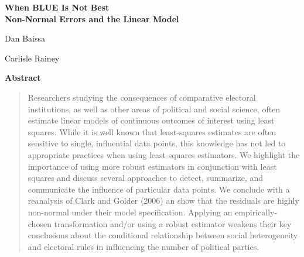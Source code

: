 \documentclass[12pt]{article}
\begin{document}
\begin{center}
{\LARGE \textbf{When BLUE Is Not Best}}\\\vspace{2mm}
{ \textbf{Non-Normal Errors and the Linear Model}}\\\vspace{2mm}


\vspace{10mm}

Dan Baissa

\vspace{3mm}

Carlisle Rainey
\end{center}

\vspace{10mm}

{\centerline{\textbf{Abstract}}}
\begin{quote}\noindent
Researchers studying the consequences of comparative electoral institutions, as well as other areas of political and social science, often estimate linear models of continuous outcomes of interest using least squares. 
While it is well known that least-squares estimates are often sensitive to single, influential data points, this knowledge has not led to appropriate practices when using least-squares estimators. 
We highlight the importance of using more robust estimators in conjunction with least squares and discuss several approaches to detect, summarize, and communicate the influence of particular data points. 
We conclude with a reanalysis of Clark and Golder (2006) an show that the residuals are highly non-normal under their model specification. 
Applying an empirically-chosen transformation and/or using a robust estimator weakens their key conclusions about the conditional relationship between social heterogeneity and electoral rules in influencing the number of political parties.
 \end{quote}
\end{document}
